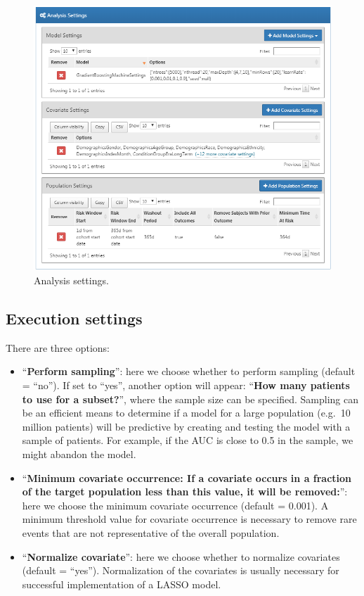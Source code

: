 \documentclass[11pt]{book}
\providecommand{\tightlist}{%
  \setlength{\itemsep}{0pt}\setlength{\parskip}{0pt}}
\theoremstyle{definition}
\theoremstyle{definition}
\theoremstyle{definition}
\theoremstyle{remark}
\begin{document}
\begin{figure}

{\centering \includegraphics[width=1\linewidth]{images/PatientLevelPrediction/analysisSettings} 

}

\caption{Analysis settings.}\label{fig:analysisSettings}
\end{figure}

\hypertarget{execution-settings}{%
\subsection{Execution settings}\label{execution-settings}}

There are three options:

\begin{itemize}
\tightlist
\item
  ``\textbf{Perform sampling}'': here we choose whether to perform sampling (default = ``no''). If set to ``yes'', another option will appear: ``\textbf{How many patients to use for a subset?}'', where the sample size can be specified. Sampling can be an efficient means to determine if a model for a large population (e.g.~10 million patients) will be predictive by creating and testing the model with a sample of patients. For example, if the AUC is close to 0.5 in the sample, we might abandon the model.
\item
  ``\textbf{Minimum covariate occurrence: If a covariate occurs in a fraction of the target population less than this value, it will be removed:}'': here we choose the minimum covariate occurrence (default = 0.001). A minimum threshold value for covariate occurrence is necessary to remove rare events that are not representative of the overall population.
\item
  ``\textbf{Normalize covariate}'': here we choose whether to normalize covariates (default = ``yes''). Normalization of the covariates is usually necessary for successful implementation of a LASSO model.
\end{itemize}
\end{document}
